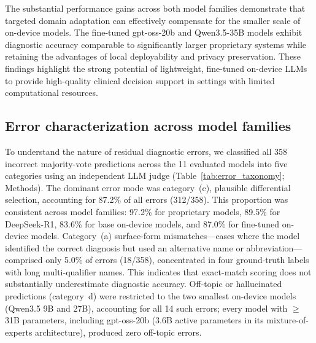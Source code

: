 \documentclass[10pt,journal,compsoc, onecolumn]{IEEEtran}
\begin{document}

The substantial performance gains across both model families demonstrate that targeted domain adaptation can effectively compensate for the smaller scale of on-device models. The fine-tuned gpt-oss-20b and Qwen3.5-35B models exhibit diagnostic accuracy comparable to significantly larger proprietary systems while retaining the advantages of local deployability and privacy preservation. These findings highlight the strong potential of lightweight, fine-tuned on-device LLMs to provide high-quality clinical decision support in settings with limited computational resources.


\subsection*{Error characterization across model families}

To understand the nature of residual diagnostic errors, we classified all 358 incorrect majority-vote predictions across the 11 evaluated models into five categories using an independent LLM judge (Table~\ref{tab:error_taxonomy}; Methods). The dominant error mode was category~(c), plausible differential selection, accounting for 87.2\% of all errors (312/358). This proportion was consistent across model families: 97.2\% for proprietary models, 89.5\% for DeepSeek-R1, 83.6\% for base on-device models, and 87.0\% for fine-tuned on-device models. Category~(a) surface-form mismatches---cases where the model identified the correct diagnosis but used an alternative name or abbreviation---comprised only 5.0\% of errors (18/358), concentrated in four ground-truth labels with long multi-qualifier names. This indicates that exact-match scoring does not substantially underestimate diagnostic accuracy. Off-topic or hallucinated predictions (category~d) were restricted to the two smallest on-device models (Qwen3.5 9B and 27B), accounting for all 14 such errors; every model with $\geq$31B parameters, including gpt-oss-20b (3.6B active parameters in its mixture-of-experts architecture), produced zero off-topic errors.
\end{document}
